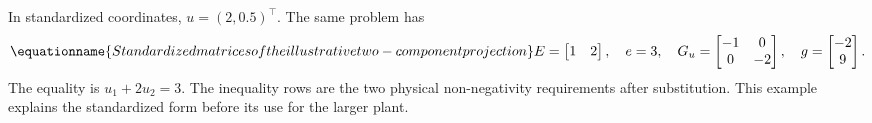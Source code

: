 In standardized coordinates, $u=(2,0.5)^\top$. The same problem has
\begin{equation}
\equationname{Standardized matrices of the illustrative two-component projection}
E=\begin{bmatrix}1&2\end{bmatrix},\quad e=3,\quad
G_u=\begin{bmatrix}-1&0\\0&-2\end{bmatrix},\quad
g=\begin{bmatrix}-2\\9\end{bmatrix}.
\end{equation}
The equality is $u_1+2u_2=3$. The inequality rows are the two physical non-negativity requirements after substitution. This example explains the standardized form before its use for the larger plant.

